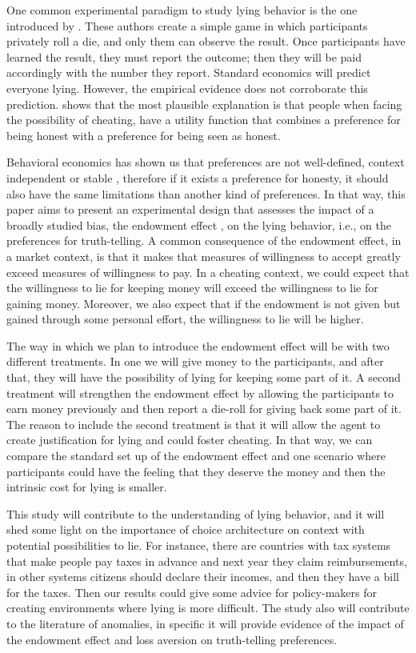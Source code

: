 \documentclass[12pt,final]{article}
\begin{document}
One common experimental paradigm to study lying behavior is the one introduced by \citet{Fischbacher2013}. These authors create a simple game in which participants privately roll a die, and only them can observe the result. Once participants have learned the result,  they must report the outcome; then they will be paid accordingly with the number they report.  Standard economics will predict everyone lying. However, the empirical evidence does not corroborate this prediction. \citet{Abeler} shows that the most plausible explanation is that people when facing the possibility of cheating, have a utility function that combines a preference for being honest with a preference for being seen as honest.


Behavioral economics has shown us that preferences are not well-defined, context independent or stable \citep{Loewenstein2003,Simonsohn2006,Ariely2003,Ariely2006}, therefore if it exists a preference for honesty, it should also have the same limitations than another kind of preferences. In that way, this paper aims to present an experimental design that assesses the impact of a broadly studied bias, the endowment effect \citep{Kahneman2011,Kahneman1991}, on the lying behavior, i.e., on the preferences for truth-telling. A common consequence of the endowment effect, in a market context, is that it makes that measures of willingness to accept greatly exceed measures of willingness to pay. In a cheating context, we could expect that the willingness to lie for keeping money will exceed the willingness to lie for gaining money. Moreover, we also expect that if the endowment is not given but gained through some personal effort, the willingness to lie will be higher.

The way in which we plan to introduce the endowment effect will be with two different treatments. In one we will give money to the participants, and after that, they will have the possibility of lying for keeping some part of it. A second treatment will strengthen the endowment effect by allowing the participants to earn money previously and then report a die-roll for giving back some part of it. The reason to include the second treatment is that it will allow the agent to create justification for lying and could foster cheating. In that way, we can compare the standard set up of the endowment effect and one scenario where participants could have the feeling that they deserve the money and then the intrinsic cost for lying is smaller.

This study will contribute to the understanding of lying behavior, and it will shed some light on the importance of choice architecture on context with potential possibilities to lie. For instance, there are countries with tax systems that make people pay taxes in advance and next year they claim reimbursements, in other systems citizens should declare their incomes, and then they have a bill for the taxes. Then our results could give some advice for policy-makers for creating environments where lying is more difficult. The study also will contribute to the literature of anomalies, in specific it will provide evidence of the impact of the endowment effect \citep{Kahneman2011,Kahneman1991} and loss aversion \citep{Tversky1991} on truth-telling preferences.
\end{document}
